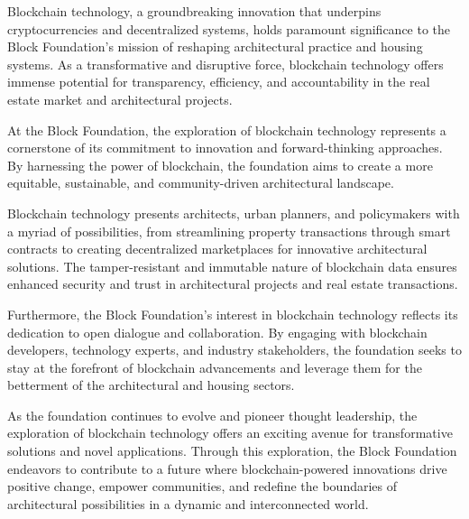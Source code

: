 Blockchain technology, a groundbreaking innovation that underpins cryptocurrencies and decentralized systems, holds paramount significance to the Block Foundation's mission of reshaping architectural practice and housing systems. As a transformative and disruptive force, blockchain technology offers immense potential for transparency, efficiency, and accountability in the real estate market and architectural projects.

At the Block Foundation, the exploration of blockchain technology represents a cornerstone of its commitment to innovation and forward-thinking approaches. By harnessing the power of blockchain, the foundation aims to create a more equitable, sustainable, and community-driven architectural landscape.

Blockchain technology presents architects, urban planners, and policymakers with a myriad of possibilities, from streamlining property transactions through smart contracts to creating decentralized marketplaces for innovative architectural solutions. The tamper-resistant and immutable nature of blockchain data ensures enhanced security and trust in architectural projects and real estate transactions.

Furthermore, the Block Foundation's interest in blockchain technology reflects its dedication to open dialogue and collaboration. By engaging with blockchain developers, technology experts, and industry stakeholders, the foundation seeks to stay at the forefront of blockchain advancements and leverage them for the betterment of the architectural and housing sectors.

As the foundation continues to evolve and pioneer thought leadership, the exploration of blockchain technology offers an exciting avenue for transformative solutions and novel applications. Through this exploration, the Block Foundation endeavors to contribute to a future where blockchain-powered innovations drive positive change, empower communities, and redefine the boundaries of architectural possibilities in a dynamic and interconnected world.